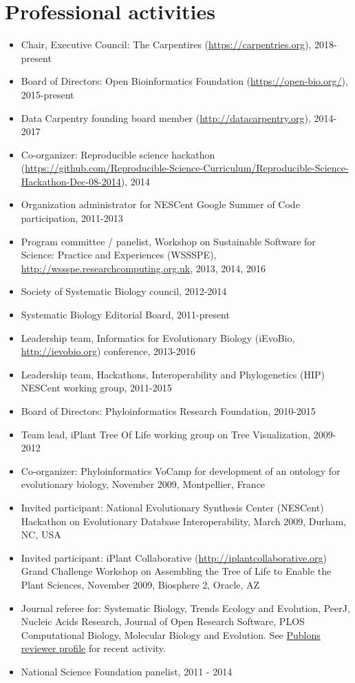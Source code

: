 \documentclass[10pt]{article}
\begin{document}
\section*{Professional activities}
\begin{itemize}
\item{Chair, Executive Council: The Carpentires (\url{https://carpentries.org}), 2018-present}
\item{Board of Directors: Open Bioinformatics Foundation (\url{https://open-bio.org/}), 2015-present}
\item{Data Carpentry founding board member (\url{http://datacarpentry.org}), 2014-2017}
\item{Co-organizer: Reproducible science hackathon (\url{https://github.com/Reproducible-Science-Curriculum/Reproducible-Science-Hackathon-Dec-08-2014}), 2014}
\item{Organization administrator for NESCent Google Summer of Code participation, 2011-2013}
\item{Program committee / panelist, Workshop on Sustainable Software for Science: Practice and Experiences (WSSSPE), \url{http://wssspe.researchcomputing.org.uk}, 2013, 2014, 2016}
\item{Society of Systematic Biology council, 2012-2014}
\item{Systematic Biology Editorial Board, 2011-present}
\item{Leadership team, Informatics for Evolutionary Biology (iEvoBio, \url{http://ievobio.org}) conference, 2013-2016}
\item{Leadership team, Hackathons, Interoperability and Phylogenetics (HIP) NESCent working group, 2011-2015}
\item{Board of Directors: Phyloinformatics Research Foundation, 2010-2015}
\item{Team lead, iPlant Tree Of Life working group on Tree Visualization, 2009-2012}
\item{Co-organizer: Phyloinformatics VoCamp for development of an ontology for evolutionary biology, November 2009, Montpellier, France}
\item{Invited participant: National Evolutionary Synthesis Center (NESCent) Hackathon on Evolutionary Database Interoperability, March 2009, Durham, NC, USA}
\item{Invited participant: iPlant Collaborative (\url{http://iplantcollaborative.org}) Grand Challenge Workshop on Assembling the Tree of Life to Enable the Plant Sciences, November 2009, Biosphere 2, Oracle, AZ}
\item{Journal referee for: Systematic Biology, Trends Ecology and Evolution, PeerJ, Nucleic Acids Research, Journal of Open Research Software, PLOS Computational Biology, Molecular Biology and Evolution}. See \href{https://publons.com/a/213683/}{Publons reviewer profile} for recent activity. 
\item{National Science Foundation panelist, 2011 - 2014}
\end{itemize}
\end{document}
